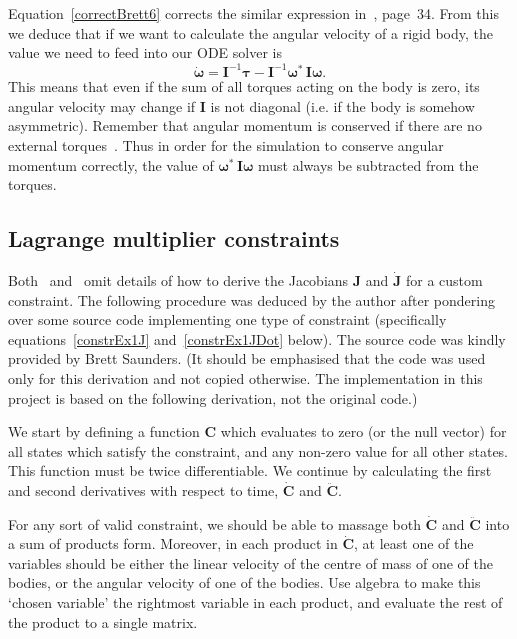 Equation~\ref{correctBrett6} corrects the similar expression in~\cite{Saunders:PhD},
page~34. From this we deduce that if we want to calculate the angular velocity of a rigid
body, the value we need to feed into our ODE solver is
\begin{equation}
\dot{\bm{\omega}} = \mathbf{I}^{-1}\bm{\tau} -
    \mathbf{I}^{-1}\bm{\omega}^*\,\mathbf{I}\bm{\omega}.
\end{equation}
This means that even if the sum of all torques acting on the body is zero, its angular
velocity may change if $\mathbf{I}$ is not diagonal (i.e. if the body is somehow asymmetric).
Remember that angular momentum is conserved if there are no external torques~\cite{Feynman:63}.
Thus in order for the simulation to conserve angular momentum correctly, the value of
$\bm{\omega}^*\,\mathbf{I}\bm{\omega}$ must always be subtracted from the torques.


\subsection{Lagrange multiplier constraints}

Both~\cite{BaraffWitkin:97} and~\cite{Saunders:PhD} omit details of how to derive the Jacobians
$\mathbf{J}$ and $\dot{\mathbf{J}}$ for a custom constraint. The following procedure was deduced
by the author after pondering over some source code implementing one type of constraint
(specifically equations~\ref{constrEx1J} and~\ref{constrEx1JDot} below). The source code
was kindly provided by Brett Saunders. (It should be emphasised that the code was used only
for this derivation and not copied otherwise. The implementation in this project is based
on the following derivation, not the original code.)

We start by defining a function $\mathbf{C}$ which evaluates to zero (or the null vector) for
all states which satisfy the constraint, and any non-zero value for all other states. This
function must be twice differentiable. We continue by calculating the first and second
derivatives with respect to time, $\dot{\mathbf{C}}$ and $\ddot{\mathbf{C}}$.

For any sort of valid constraint, we should be able to massage both $\dot{\mathbf{C}}$ and
$\ddot{\mathbf{C}}$ into a sum of products form. Moreover, in each product in
$\dot{\mathbf{C}}$, at least one of the variables should be either the linear velocity of
the centre of mass of one of the bodies, or the angular velocity of one of the bodies.
Use algebra to make this `chosen variable' the rightmost variable in each product, and
evaluate the rest of the product to a single matrix.

